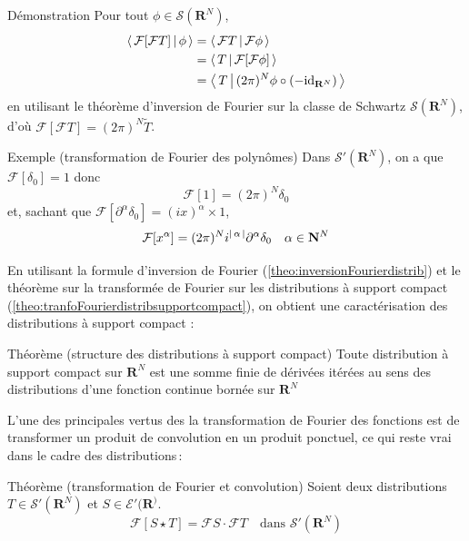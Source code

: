         \begin{demo}{Démonstration}
            Pour tout $\phi \in \mathcal{S}(\mathbf{R}^N)$, 
            \begin{align*}
                \left< \, \mathcal{F}[\mathcal{F}T] \, \middle| \, \phi \, \right> 
                &= \left< \, \mathcal{F}T \, \middle| \, \mathcal{F}\phi \, \right> \\
                &= \left< \, T \, \middle| \, \mathcal{F}[\mathcal{F}\phi] \, \right> \\
                &= \left< \, T \, \middle| \, (2\pi)^N \phi \circ (-\text{id}_{\mathbf{R}^N}) \, \right> \\
            \end{align*}
            en utilisant le théorème d’inversion de Fourier sur la classe de Schwartz $\mathcal{S}(\mathbf{R}^N)$, d’où $\mathcal{F}[\mathcal{F}T] = (2\pi)^N \tilde{T}$.
        \end{demo}

        \begin{demo}{Exemple (transformation de Fourier des polynômes)}
            Dans $\mathcal{S}'(\mathbf{R}^N)$, on a que $\mathcal{F}[\delta_0] = 1$ donc 
            \[ \mathcal{F}[1] = (2\pi)^N \delta_0 \]   
            et, sachant que $\mathcal{F}[\partial^{\alpha} \delta_0] = (ix)^{\alpha} \times 1$,
            \[ \mathcal{F}[x^{\alpha}] = (2\pi)^N i^{\left\lvert \, \alpha \, \right\rvert} \partial^{\alpha} \delta_0 \quad \alpha \in \mathbf{N}^N \]
        \end{demo}

        En utilisant la formule d’inversion de Fourier (\ref{theo:inversionFourierdistrib}) et le théorème sur la transformée de Fourier sur les distributions à support compact (\ref{theo:tranfoFourierdistribsupportcompact}), on obtient une caractérisation des distributions à support compact :

        \begin{omed}{Théorème (structure des distributions à support compact)}
            Toute distribution à support compact sur $\mathbf{R}^N$ est une somme finie de dérivées itérées au sens des distributions d’une fonction continue bornée sur $\mathbf{R}^N$
        \end{omed}

        L’une des principales vertus des la transformation de Fourier des fonctions est de transformer un produit de convolution en un produit ponctuel, ce qui reste vrai dans le cadre des distributions :

        \begin{omed}{Théorème (transformation de Fourier et convolution)}
            Soient deux distributions $T \in \mathcal{S}'(\mathbf{R}^N)$ et $S \in \mathcal{E}'(\mathbf{R}^)$. 
            \[ \mathcal{F}[S \star T] = \mathcal{F}S \cdot \mathcal{F}T \quad \text{dans } \mathcal{S}'(\mathbf{R}^N) \]
        \end{omed}

